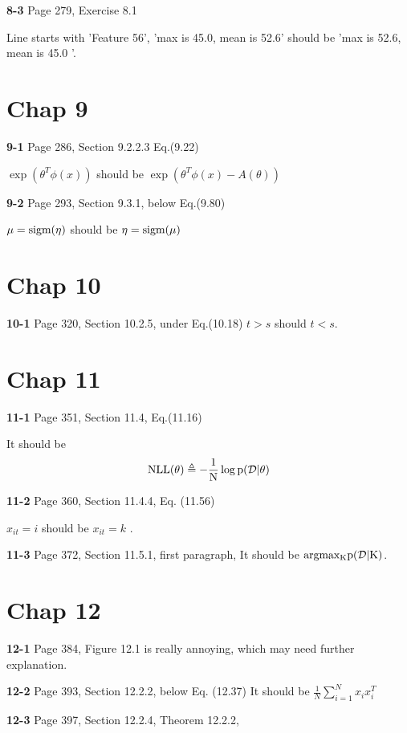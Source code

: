 \documentclass[aps,preprint,a4]{revtex4-1}
\newcommand{\nl}{\nonumber \\}
\begin{document}
{\color{red}\textbf{8-3}} Page 279, Exercise 8.1 

Line starts with 'Feature 56', 'max is 45.0, mean is 52.6' should be
'max is 52.6, mean is 45.0 '.



\section{Chap 9}
{\color{red}\textbf{9-1}} Page 286, Section 9.2.2.3 Eq.(9.22)

$\exp{(\theta^{T}\phi(x))}$ should be $\exp{(\theta^{T}\phi(x)-A(\theta))}$

{\color{red}\textbf{9-2}} Page 293, Section 9.3.1, below Eq.(9.80)

$\mu = \rm sigm(\eta)$ should be $\eta = \rm sigm(\mu)$


\section{Chap 10}
{\color{red}\textbf{10-1}} Page 320, Section 10.2.5, under Eq.(10.18)
$t>s$ should $t<s$.

\section{Chap 11}
{\color{red}\textbf{11-1}} Page 351, Section 11.4, Eq.(11.16)

It should be
\begin{equation}
\rm NLL(\theta) \triangleq -\frac{1}{N} \log p(\mathcal D|\theta)\nl
\end{equation}

{\color{red}\textbf{11-2}} Page 360, Section 11.4.4, Eq. (11.56)

$x_{it}=i$ should be $x_{it}=k$ .

{\color{red}\textbf{11-3}} Page 372, Section 11.5.1, first paragraph,
It should be $\rm argmax_{K}p(\mathcal D|K)$.


\section{Chap 12}
{\color{red}\textbf{12-1}} Page 384, Figure 12.1 is really annoying, which may need
further explanation.

{\color{red}\textbf{12-2}} Page 393, Section 12.2.2, below Eq. (12.37)
It should be $\frac{1}{N}\sum_{i=1}^{N}x_{i}x_{i}^{T}$

{\color{red}\textbf{12-3}} Page 397, Section 12.2.4, Theorem 12.2.2,
\end{document}

